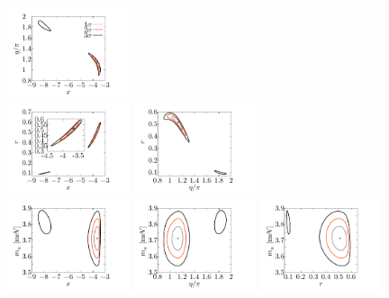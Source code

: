 \documentclass[a4paper,11pt]{article}
\begin{document}
\begin{figure}[!h]
 \flushleft
\hspace{15mm}\includegraphics[width=0.32\textwidth]{figs/x_eta.pdf}$~~~~~~$\\
\hspace{15mm} \includegraphics[width=0.32\textwidth]{figs/x_r.pdf}\hspace{-11mm}
 \includegraphics[width=0.32\textwidth]{figs/eta_r.pdf}$~~~~~~$\\
\hspace{15mm} \includegraphics[width=0.32\textwidth]{figs/x_ma.pdf}\hspace{-11mm}
 \includegraphics[width=0.32\textwidth]{figs/eta_ma.pdf}\hspace{-11mm}
 \includegraphics[width=0.32\textwidth]{figs/r_ma.pdf}

\end{figure}
\end{document}
